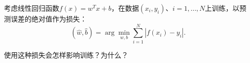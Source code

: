 考虑线性回归函数\(f(x)=w^Tx+b\)，在数据\((x_i,y_i)\)、\(i=1,\ldots,N\)上训练，以预测误差的绝对值作为损失：
\[
(\hat w,\hat b)=\arg\min_{w,b}\sum_{i=1}^N|f(x_i)-y_i|.
\]


使用这种损失会怎样影响训练？为什么？
